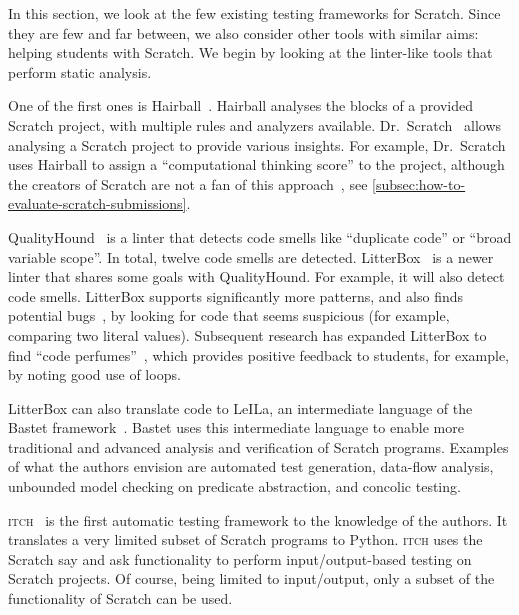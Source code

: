 \documentclass[../main]{subfiles}
\begin{document}
In this section, we look at the few existing testing frameworks for Scratch.
Since they are few and far between, we also consider other tools with similar aims: helping students with Scratch.
We begin by looking at the linter-like tools that perform static analysis.

One of the first ones is Hairball~\autocite{boeHairballLintinspiredStatic2013}.
Hairball analyses the blocks of a provided Scratch project, with multiple rules and analyzers available.
Dr.\ Scratch~\autocite{moreno-leonDrScratchWeb2015} allows analysing a Scratch project to provide various insights.
For example, Dr.\ Scratch uses Hairball to assign a ``computational thinking score'' to the project, although the creators of Scratch are not a fan of this approach~\autocite{resnickCodingCrossroads2020}, see \cref{subsec:how-to-evaluate-scratch-submissions}.

QualityHound~\autocite{techapalokulQualityHoundOnline2017} is a linter that detects code smells like ``duplicate code'' or ``broad variable scope''.
In total, twelve code smells are detected.
LitterBox~\autocite{fraserLitterBoxLinterScratch2021} is a newer linter that shares some goals with QualityHound.
For example, it will also detect code smells.
LitterBox supports significantly more patterns, and also finds potential bugs~\autocite{fradrichCommonBugsScratch2020}, by looking for code that seems suspicious (for example, comparing two literal values).
Subsequent research has expanded LitterBox to find ``code perfumes''~\autocite{obermullerCodePerfumesReporting2021}, which provides positive feedback to students, for example, by noting good use of loops.

LitterBox can also translate code to LeILa, an intermediate language of the Bastet framework~\autocite{stahlbauerVerifiedScratchProgram2020}.
Bastet uses this intermediate language to enable more traditional and advanced analysis and verification of Scratch programs.
Examples of what the authors envision are automated test generation, data-flow analysis, unbounded model checking on predicate abstraction, and concolic testing.

\textsc{itch}~\autocite{johnsonITCHIndividualTesting2016} is the first automatic testing framework to the knowledge of the authors.
It translates a very limited subset of Scratch programs to Python.
\textsc{itch} uses the Scratch say and ask functionality to perform input/output-based testing on Scratch projects.
Of course, being limited to input/output, only a subset of the functionality of Scratch can be used.
\end{document}
